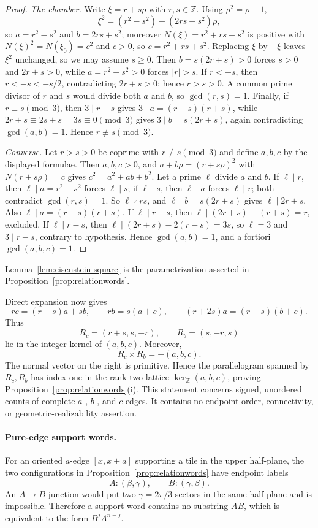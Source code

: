 \documentclass[11pt]{amsart}
\theoremstyle{definition}
\theoremstyle{remark}
\newcommand{\Z}{\mathbb Z}
\begin{document}
\begin{proof}
\emph{The chamber.}  Write $\xi=r+s\rho$ with $r,s\in\Z$.  Using
$\rho^2=\rho-1$,
\[
 \xi^2=(r^2-s^2)+(2rs+s^2)\rho ,
\]
so $a=r^2-s^2$ and $b=2rs+s^2$; moreover $N(\xi)=r^2+rs+s^2$ is positive with
$N(\xi)^2=N(\xi_0)=c^2$ and $c>0$, so $c=r^2+rs+s^2$.  Replacing $\xi$ by
$-\xi$ leaves $\xi^2$ unchanged, so we may assume $s\ge0$.  Then
$b=s(2r+s)>0$ forces $s>0$ and $2r+s>0$, while $a=r^2-s^2>0$ forces $|r|>s$.
If $r<-s$, then $r<-s<-s/2$, contradicting $2r+s>0$; hence $r>s>0$.  A common
prime divisor of $r$ and $s$ would divide both $a$ and $b$, so
$\gcd(r,s)=1$.  Finally, if $r\equiv s\pmod3$, then $3\mid r-s$ gives
$3\mid a=(r-s)(r+s)$, while $2r+s\equiv2s+s=3s\equiv0\pmod3$ gives
$3\mid b=s(2r+s)$, again contradicting $\gcd(a,b)=1$.  Hence
$r\not\equiv s\pmod3$.

\emph{Converse.}  Let $r>s>0$ be coprime with $r\not\equiv s\pmod3$ and define
$a,b,c$ by the displayed formulae.  Then $a,b,c>0$, and
$a+b\rho=(r+s\rho)^2$ with $N(r+s\rho)=c$ gives $c^2=a^2+ab+b^2$.  Let a prime
$\ell$ divide $a$ and $b$.  If $\ell\mid r$, then $\ell\mid a=r^2-s^2$ forces
$\ell\mid s$; if $\ell\mid s$, then $\ell\mid a$ forces $\ell\mid r$; both
contradict $\gcd(r,s)=1$.  So $\ell\nmid rs$, and $\ell\mid b=s(2r+s)$ gives
$\ell\mid2r+s$.  Also $\ell\mid a=(r-s)(r+s)$.  If $\ell\mid r+s$, then
$\ell\mid(2r+s)-(r+s)=r$, excluded.  If $\ell\mid r-s$, then
$\ell\mid(2r+s)-2(r-s)=3s$, so $\ell=3$ and $3\mid r-s$, contrary to
hypothesis.  Hence $\gcd(a,b)=1$, and a fortiori $\gcd(a,b,c)=1$.
\end{proof}

Lemma~\ref{lem:eisenstein-square} is the parametrization asserted in
Proposition~\ref{prop:relationwords}.

Direct expansion now gives
\[
 rc=(r+s)a+sb,\qquad rb=s(a+c),\qquad
 (r+2s)a=(r-s)(b+c).
\]
Thus
\[
 R_c=(r+s,s,-r),\qquad R_b=(s,-r,s)
\]
lie in the integer kernel of $(a,b,c)$.  Moreover,
\[
                         R_c\times R_b=-(a,b,c).
\]
The normal vector on the right is primitive.  Hence the parallelogram
spanned by $R_c,R_b$ has index one in the rank-two lattice
$\ker_{\Z}(a,b,c)$, proving
Proposition~\ref{prop:relationwords}(i).  This statement concerns signed,
unordered counts of complete $a$-, $b$-, and $c$-edges.  It contains no
endpoint order, connectivity, or geometric-realizability assertion.

\paragraph{Pure-edge support words.}
For an oriented $a$-edge $[x,x+a]$ supporting a tile in the upper
half-plane, the two configurations in
Proposition~\ref{prop:relationwords} have endpoint labels
\[
                   A:(\beta,\gamma),\qquad
                   B:(\gamma,\beta).
\]
An $A\to B$ junction would put two $\gamma=2\pi/3$ sectors in the same
half-plane and is impossible.  Therefore a support word contains no
substring $AB$, which is equivalent to the form $B^jA^{n-j}$.
\end{document}
